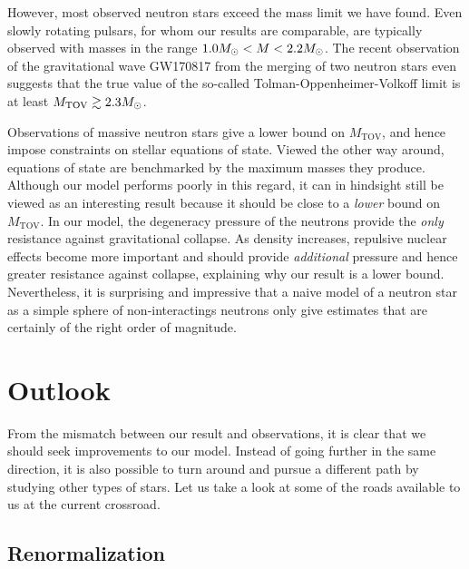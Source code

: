 However, most observed neutron stars exceed the mass limit we have found.
Even slowly rotating pulsars, for whom our results are comparable, \cite[section 2.1]{ref:neutron_star_physics} are typically observed with masses in the range $1.0 M_\odot < M < 2.2 M_\odot$. \cite[figure 2 and 3]{ref:neutron_star_masses_paper}
The recent observation of the gravitational wave GW170817 from the merging of two neutron stars even suggests that the true value of the so-called Tolman-Oppenheimer-Volkoff limit is at least $M_\text{TOV} \gtrsim 2.3 M_\odot$. \cite{ref:gravitational_wave_tov_limit}

Observations of massive neutron stars give a lower bound on $M_\text{TOV}$, and hence impose constraints on stellar equations of state.
Viewed the other way around, equations of state are benchmarked by the maximum masses they produce.
Although our model performs poorly in this regard, it can in hindsight still be viewed as an interesting result because it should be close to a \emph{lower} bound on $M_\text{TOV}$.
In our model, the degeneracy pressure of the neutrons provide the \emph{only} resistance against gravitational collapse.
As density increases, repulsive nuclear effects become more important and should provide \emph{additional} pressure and hence greater resistance against collapse, explaining why our result is a lower bound. \cite[section 3.9.8]{ref:glendenning}
Nevertheless, it is surprising and impressive that a naive model of a neutron star as a simple sphere of non-interactings neutrons only give estimates that are certainly of the right order of magnitude.

\section{Outlook}

From the mismatch between our result and observations, it is clear that we should seek improvements to our model.
Instead of going further in the same direction, it is also possible to turn around and pursue a different path by studying other types of stars.
Let us take a look at some of the roads available to us at the current crossroad.

\subsection*{Renormalization}

